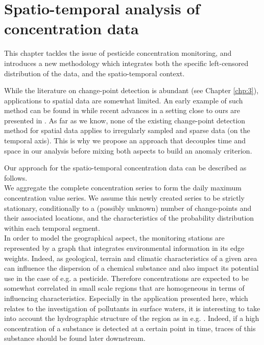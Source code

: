 \chapter{Spatio-temporal analysis of concentration data}\label{chp:5}

\minitoc

\clearpage

This chapter tackles the issue of pesticide concentration monitoring, and introduces a new methodology which integrates both the specific left-censored distribution of the data, and the spatio-temporal context. 

While the literature on change-point detection is abundant (see Chapter \ref{chp:3}), applications to spatial data are somewhat limited. An early example of such method can be found in \cite{MAJUMDAR2005149} while recent advances in a setting close to ours are presented in \cite{doi:10.1080/07474946.2020.1826796}. As far as we know, none of the existing change-point detection method for spatial data applies to irregularly sampled and sparse data (on the temporal axis). This is why we propose an approach that decouples time and space in our analysis before mixing both aspects to build an anomaly criterion.  

Our approach for the spatio-temporal concentration data can be described as follows. \\
We aggregate the complete concentration series to form the daily maximum concentration value series. We assume this newly created series to be strictly stationary, conditionally to a (possibly unknown) number of change-points and their associated locations, and the characteristics of the probability distribution within each temporal segment. \\
In order to model the geographical aspect, the monitoring stations are represented by a graph that integrates environmental information in its edge weights. Indeed, as geological, terrain and climatic characteristics of a given area can influence the dispersion of a chemical substance and also impact its potential use in the case of e.g. a pesticide. Therefore concentrations are expected to be somewhat correlated in small scale regions that are homogeneous in terms of influencing characteristics. Especially in the application presented here, which relates to the investigation of pollutants in surface waters, it is interesting to take into account the hydrographic structure of the region as in e.g. \cite{doi:10.1080/07474946.2020.1826796}. Indeed, if a high concentration of a substance is detected at a certain point in time, traces of this substance should be found later downstream. 

